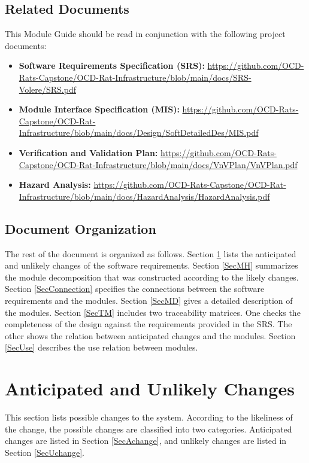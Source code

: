 \documentclass[12pt, titlepage]{article}
\begin{document}
\subsection{Related Documents}

This Module Guide should be read in conjunction with the following project documents:

\begin{itemize}
  \item \textbf{Software Requirements Specification (SRS):} \url{https://github.com/OCD-Rats-Capstone/OCD-Rat-Infrastructure/blob/main/docs/SRS-Volere/SRS.pdf}
  \item \textbf{Module Interface Specification (MIS):} \url{https://github.com/OCD-Rats-Capstone/OCD-Rat-Infrastructure/blob/main/docs/Design/SoftDetailedDes/MIS.pdf}
  \item \textbf{Verification and Validation Plan:} \url{https://github.com/OCD-Rats-Capstone/OCD-Rat-Infrastructure/blob/main/docs/VnVPlan/VnVPlan.pdf}
  \item \textbf{Hazard Analysis:} \url{https://github.com/OCD-Rats-Capstone/OCD-Rat-Infrastructure/blob/main/docs/HazardAnalysis/HazardAnalysis.pdf}
\end{itemize}

\subsection{Document Organization}

The rest of the document is organized as follows. Section
\ref{SecChange} lists the anticipated and unlikely changes of the software
requirements. Section \ref{SecMH} summarizes the module decomposition that
was constructed according to the likely changes. Section \ref{SecConnection}
specifies the connections between the software requirements and the
modules. Section \ref{SecMD} gives a detailed description of the
modules. Section \ref{SecTM} includes two traceability matrices. One checks
the completeness of the design against the requirements provided in the SRS. The
other shows the relation between anticipated changes and the modules. Section
\ref{SecUse} describes the use relation between modules.

\section{Anticipated and Unlikely Changes} \label{SecChange}

This section lists possible changes to the system. According to the likeliness
of the change, the possible changes are classified into two
categories. Anticipated changes are listed in Section \ref{SecAchange}, and
unlikely changes are listed in Section \ref{SecUchange}.
\end{document}

